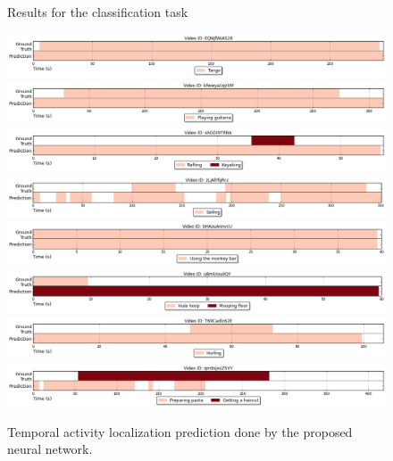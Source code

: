 \begin{figure}[H]
\caption{Results for the classification task}
\label{fig:results_visualization_classification}
\end{figure}


\begin{figure}[H]
\begin{center}
\includegraphics[width=1\linewidth]{img/results/activity_detection/activity_temporal_localization_0}
\includegraphics[width=1\linewidth]{img/results/activity_detection/activity_temporal_localization_1}
\includegraphics[width=1\linewidth]{img/results/activity_detection/activity_temporal_localization_2}
\includegraphics[width=1\linewidth]{img/results/activity_detection/activity_temporal_localization_3}
\includegraphics[width=1\linewidth]{img/results/activity_detection/activity_temporal_localization_4}
\includegraphics[width=1\linewidth]{img/results/activity_detection/activity_temporal_localization_5}
\includegraphics[width=1\linewidth]{img/results/activity_detection/activity_temporal_localization_6}
\includegraphics[width=1\linewidth]{img/results/activity_detection/activity_temporal_localization_7}
\end{center}
\caption{Temporal activity localization prediction done by the proposed neural network.}
\label{fig:results_visualization_detection}
\end{figure}


